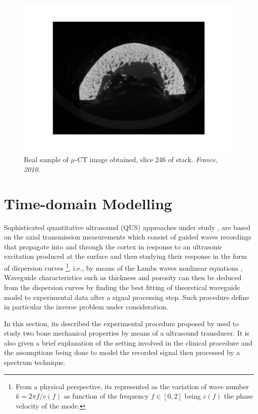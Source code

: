 \begin{figure}[!h]
	\centering
	\includegraphics[scale=.5]{images/ImgExt/246-2010_rec0964.pdf}
	\caption{Real sample of $\mu$-CT image obtained, slice 246 of stack. \textit{France, 2010}.}
	\label{muCT-Image}
\end{figure}

\section{Time-domain Modelling}

Sophisticated quantitative ultrasound (QUS) approaches under study \cite{Foiret2014} \cite{Minonzio2018}, are based on the axial transmission measurements which consist of guided waves recordings that propagate into and through the cortex in response to an ultrasonic excitation produced at the surface and then studying their response in the form of dispersion curves \footnote{From a physical perspective, its represented as the variation of wave number $k = 2 \pi f/c(f)$ as function of the frequency $f \in [0, 2]$ being $c(f)$ the phase velocity of the mode.}, i.e., by means of the Lambs waves nonlinear equations \cite{Rhee2007},
Waveguide characteristics such as thickness and porosity can then be deduced from the dispersion curves by finding the best fitting of theoretical waveguide model to experimental data after a signal processing step. Such procedure define in particular the inverse problem under consideration.

In this section, its described the experimental procedure proposed by \cite{Minonzio2018} used to study two bone mechanical properties by means of a ultrasound transducer.
It is also given a brief explanation of the setting involved in the clinical procedure and the assumptions being done to model the recorded signal then processed by a spectrum technique. 

